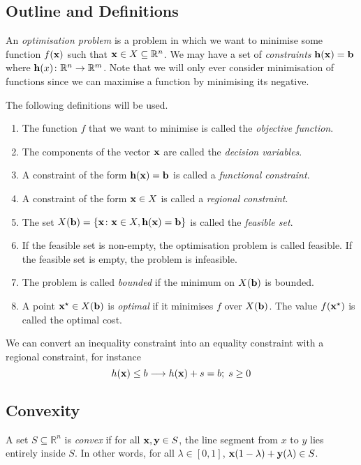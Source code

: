 \subsection{Outline and Definitions}
An \textit{optimisation problem} is a problem in which we want to minimise some function \(f(\vb x)\) such that \(\vb x \in X \subseteq \mathbb R^n\).
We may have a set of \textit{constraints} \(\vb h(\vb x) = \vb b\) where \(\vb h(x) \colon \mathbb R^n \to \mathbb R^m\).
Note that we will only ever consider minimisation of functions since we can maximise a function by minimising its negative.

\begin{definition}
	The following definitions will be used.
	\begin{enumerate}
		\item The function \(f\) that we want to minimise is called the \textit{objective function}.
		\item The components of the vector \(\vb x\) are called the \textit{decision variables}.
		\item A constraint of the form \(\vb h(\vb x) = \vb b\) is called a \textit{functional constraint}.
		\item A constraint of the form \(\vb x \in X\) is called a \textit{regional constraint}.
		\item The set \( X(\vb b) = \qty{\vb x \colon \vb x \in X, \vb h(\vb x) = \vb b} \) is called the \textit{feasible set}.
		\item If the feasible set is non-empty, the optimisation problem is called feasible.
		      If the feasible set is empty, the problem is infeasible.
		\item The problem is called \textit{bounded} if the minimum on \(X(\vb b)\) is bounded.
		\item A point \(\vb x^\star \in X(\vb b)\) is \textit{optimal} if it minimises \(f\) over \(X(\vb b)\).
		      The value \(f(\vb x^\star)\) is called the optimal cost.
	\end{enumerate}
\end{definition}

We can convert an inequality constraint into an equality constraint with a regional constraint, for instance
\[ h(\vb x) \leq b \longrightarrow h(\vb x) + s = b;\; s \geq 0 \]

\subsection{Convexity}
\begin{definition}
    A set \(S \subseteq \mathbb R^n\) is \textit{convex} if for all \(\vb x, \vb y \in S\), the line segment from \(x\) to \(y\) lies entirely inside \(S\).
    In other words, for all \(\lambda \in [0, 1]\), \(\vb x(1-\lambda) + \vb y(\lambda) \in S\).
\end{definition}

